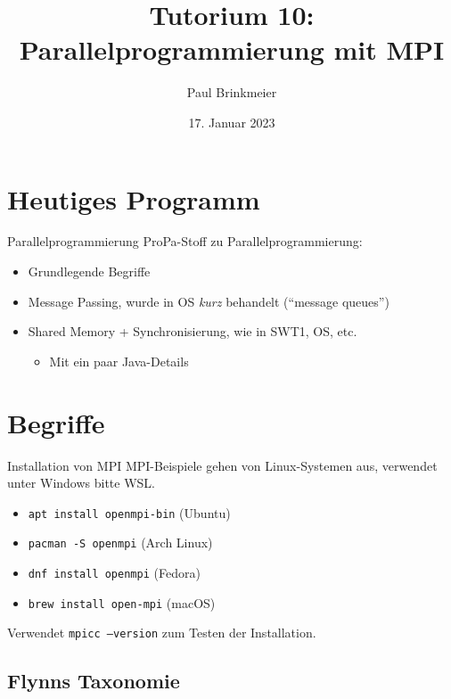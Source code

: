 \documentclass{beamer}
\title{Tutorium 10: Parallelprogrammierung mit MPI}
\author{Paul Brinkmeier}
\institute{Tutorium Programmierparadigmen am KIT}
\date{17. Januar 2023}
\begin{document}
\begin{frame}
	\titlepage
\end{frame}


\section{Heutiges Programm}

\begin{frame}{Parallelprogrammierung}
	ProPa-Stoff zu Parallelprogrammierung:

	\begin{itemize}
		\item Grundlegende Begriffe
		\item Message Passing, wurde in OS \emph{kurz} behandelt (\enquote{message queues})
		\item Shared Memory + Synchronisierung, wie in SWT1, OS, etc.
		\begin{itemize}
			\item Mit ein paar Java-Details
		\end{itemize}
	\end{itemize}
\end{frame}

\section{Begriffe}

\begin{frame}{Installation von MPI}
	MPI-Beispiele gehen von Linux-Systemen aus, verwendet unter Windows bitte WSL.

	\begin{itemize}
		\item \texttt{apt install openmpi-bin} (Ubuntu)
		\item \texttt{pacman -S openmpi} (Arch Linux)
		\item \texttt{dnf install openmpi} (Fedora)
                \item \texttt{brew install open-mpi} (macOS)
	\end{itemize}

	Verwendet \texttt{mpicc --version} zum Testen der Installation.
\end{frame}

\subsection{Flynns Taxonomie}
\end{document}
